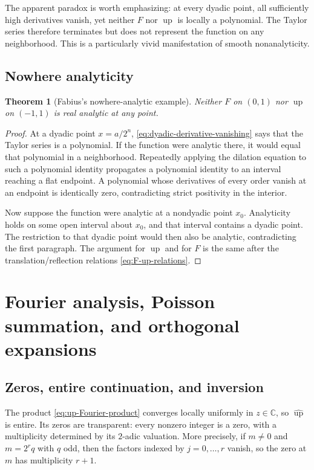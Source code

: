 \documentclass[11pt]{article}
\numberwithin{equation}{section}
\newtheorem{theorem}{Theorem}[section]
\theoremstyle{definition}
\theoremstyle{remark}
\newcommand{\C}{\mathbb C}
\newcommand{\upf}{\operatorname{up}}
\begin{document}
The apparent paradox is worth emphasizing: at every dyadic point, all sufficiently high derivatives vanish, yet neither $F$ nor $\upf$ is locally a polynomial.  The Taylor series therefore terminates but does not represent the function on any neighborhood.  This is a particularly vivid manifestation of smooth nonanalyticity.

\subsection{Nowhere analyticity}

\begin{theorem}[Fabius's nowhere-analytic example]\label{thm:nowhere-analytic}
Neither $F$ on $(0,1)$ nor $\upf$ on $(-1,1)$ is real analytic at any point.
\end{theorem}

\begin{proof}
At a dyadic point $x=a/2^n$, \eqref{eq:dyadic-derivative-vanishing} says that the Taylor series is a polynomial.  If the function were analytic there, it would equal that polynomial in a neighborhood.  Repeatedly applying the dilation equation to such a polynomial identity propagates a polynomial identity to an interval reaching a flat endpoint.  A polynomial whose derivatives of every order vanish at an endpoint is identically zero, contradicting strict positivity in the interior.

Now suppose the function were analytic at a nondyadic point $x_0$.  Analyticity holds on some open interval about $x_0$, and that interval contains a dyadic point.  The restriction to that dyadic point would then also be analytic, contradicting the first paragraph.  The argument for $\upf$ and for $F$ is the same after the translation/reflection relations \eqref{eq:F-up-relations}.
\end{proof}

\section{Fourier analysis, Poisson summation, and orthogonal expansions}\label{sec:fourier}

\subsection{Zeros, entire continuation, and inversion}

The product \eqref{eq:up-Fourier-product} converges locally uniformly in $z\in\C$, so $\widehat{\upf}$ is entire.  Its zeros are transparent: every nonzero integer is a zero, with a multiplicity determined by its $2$-adic valuation.  More precisely, if $m\ne0$ and $m=2^r q$ with $q$ odd, then the factors indexed by $j=0,\ldots,r$ vanish, so the zero at $m$ has multiplicity $r+1$.
\end{document}
